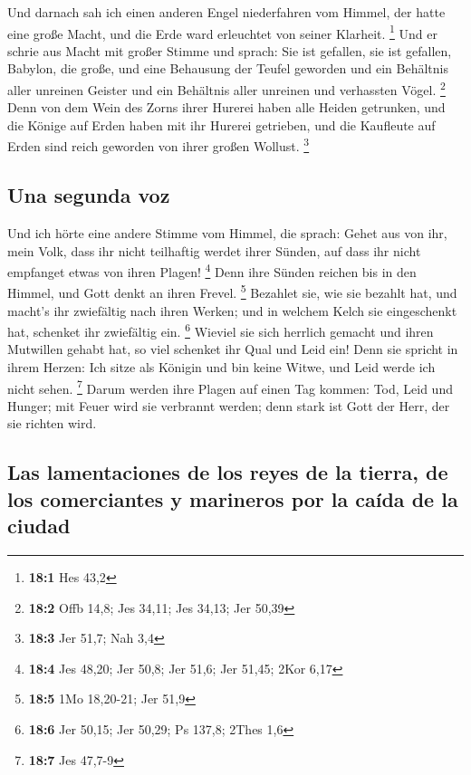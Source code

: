  Und darnach sah ich einen anderen Engel niederfahren vom
Himmel, der hatte eine große Macht, und die Erde ward erleuchtet von
seiner Klarheit. \footnote{\textbf{18:1} Hes 43,2}  Und er
schrie aus Macht mit großer Stimme und sprach: Sie ist gefallen, sie ist
gefallen, Babylon, die große, und eine Behausung der Teufel geworden und
ein Behältnis aller unreinen Geister und ein Behältnis aller unreinen
und verhassten Vögel. \footnote{\textbf{18:2} Offb 14,8; Jes 34,11; Jes
  34,13; Jer 50,39}  Denn von dem Wein des Zorns ihrer
Hurerei haben alle Heiden getrunken, und die Könige auf Erden haben mit
ihr Hurerei getrieben, und die Kaufleute auf Erden sind reich geworden
von ihrer großen Wollust. \footnote{\textbf{18:3} Jer 51,7; Nah 3,4}

\hypertarget{una-segunda-voz}{%
\subsection{Una segunda voz}\label{una-segunda-voz}}

 Und ich hörte eine andere Stimme vom Himmel, die sprach:
Gehet aus von ihr, mein Volk, dass ihr nicht teilhaftig werdet ihrer
Sünden, auf dass ihr nicht empfanget etwas von ihren Plagen! \footnote{\textbf{18:4}
  Jes 48,20; Jer 50,8; Jer 51,6; Jer 51,45; 2Kor 6,17} 
Denn ihre Sünden reichen bis in den Himmel, und Gott denkt an ihren
Frevel. \footnote{\textbf{18:5} 1Mo 18,20-21; Jer 51,9} 
Bezahlet sie, wie sie bezahlt hat, und macht's ihr zwiefältig nach ihren
Werken; und in welchem Kelch sie eingeschenkt hat, schenket ihr
zwiefältig ein. \footnote{\textbf{18:6} Jer 50,15; Jer 50,29; Ps 137,8;
  2Thes 1,6}  Wieviel sie sich herrlich gemacht und ihren
Mutwillen gehabt hat, so viel schenket ihr Qual und Leid ein! Denn sie
spricht in ihrem Herzen: Ich sitze als Königin und bin keine Witwe, und
Leid werde ich nicht sehen. \footnote{\textbf{18:7} Jes 47,7-9}
 Darum werden ihre Plagen auf einen Tag kommen: Tod, Leid
und Hunger; mit Feuer wird sie verbrannt werden; denn stark ist Gott der
Herr, der sie richten wird.

\hypertarget{las-lamentaciones-de-los-reyes-de-la-tierra-de-los-comerciantes-y-marineros-por-la-cauxedda-de-la-ciudad}{%
\subsection{Las lamentaciones de los reyes de la tierra, de los
comerciantes y marineros por la caída de la
ciudad}\label{las-lamentaciones-de-los-reyes-de-la-tierra-de-los-comerciantes-y-marineros-por-la-cauxedda-de-la-ciudad}}

